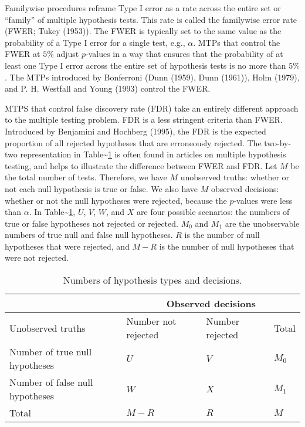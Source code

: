 \documentclass[
]{article}
\begin{document}
Familywise procedures reframe Type I error as a rate across the entire
set or ``family'' of multiple hypothesis tests. This rate is called the
familywise error rate (FWER; Tukey (1953)). The FWER is typically set to
the same value as the probability of a Type I error for a single test,
e.g., \(\alpha\). MTPs that control the FWER at \(5\%\) adjust
\(p\)-values in a way that ensures that the probability of at least one
Type I error across the entire set of hypothesis tests is no more than
\(5\%\). The MTPs introduced by Bonferroni (Dunn (1959), Dunn (1961)),
Holm (1979), and P. H. Westfall and Young (1993) control the FWER.

MTPS that control false discovery rate (FDR) take an entirely different
approach to the multiple testing problem. FDR is a less stringent
criteria than FWER. Introduced by Benjamini and Hochberg (1995), the FDR
is the expected proportion of all rejected hypotheses that are
erroneously rejected. The two-by-two representation in
Table\textasciitilde{}\ref{tab:twobytwo} is often found in articles on
multiple hypothesis testing, and helps to illustrate the difference
between FWER and FDR. Let \(M\) be the total number of tests. Therefore,
we have \(M\) unobserved truths: whether or not each null hypothesis is
true or false. We also have \(M\) observed decisions: whether or not the
null hypotheses were rejected, because the \(p\)-values were less than
\(\alpha\). In Table\textasciitilde{}\ref{tab:twobytwo}, \(U\), \(V\),
\(W\), and \(X\) are four possible scenarios: the numbers of true or
false hypotheses not rejected or rejected. \(M_0\) and \(M_1\) are the
unobservable numbers of true null and false null hypotheses. \(R\) is
the number of null hypotheses that were rejected, and \(M - R\) is the
number of null hypotheses that were not rejected.

\begin{table}[h!]
\centering
\begin{tabular}{l l l l}
                                      & \multicolumn{3}{c}{Observed decisions}\\ \hline
Unobserved truths                     & Number not rejected     & Number rejected   & Total \\ \hline
Number of true null hypotheses        & $U$                     & $V$               & $M_0$ \\
Number of false null hypotheses       & $W$                     & $X$               & $M_1$ \\ \hline
Total                                 & $M-R$                   & $R$               & $M$
\end{tabular}
\caption{Numbers of hypothesis types and decisions.}
  \label{tab:twobytwo}
\end{table}
\end{document}
